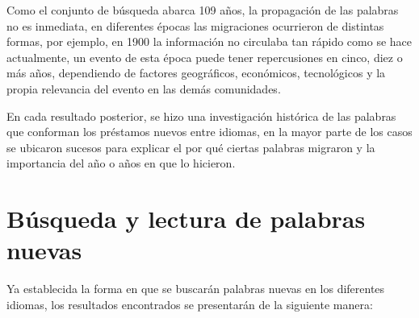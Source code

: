 Como el conjunto de búsqueda abarca 109 años,  la propagación de las palabras no es inmediata, en diferentes épocas las migraciones ocurrieron de distintas formas,  por ejemplo, en 1900 la información no circulaba tan rápido como se hace actualmente, un evento de esta época puede tener repercusiones en cinco, diez o más años,  dependiendo de factores geográficos, económicos, tecnológicos y  la  propia relevancia del evento en las demás comunidades.

En cada resultado posterior, se hizo una investigación histórica de las palabras que conforman los préstamos nuevos entre idiomas,  en la mayor parte de los casos se ubicaron sucesos para explicar el por qué ciertas palabras migraron y la importancia del año o años en que lo hicieron. 



\newpage

\section{Búsqueda y lectura de palabras nuevas}

Ya establecida la forma en que se buscarán  palabras nuevas en los diferentes idiomas,  los resultados encontrados se presentarán de la siguiente manera:

